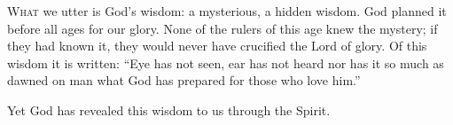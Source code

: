 
\lettrine{W}{hat} we utter is God’s wisdom: a mysterious, a hidden wisdom. God planned it before all ages for our glory. None of the rulers of this age knew the mystery; if they had known it, they would never have crucified the Lord of glory. Of this wisdom it is written:   “Eye has not seen, ear has not heard
      nor has it so much as dawned on man
      what God has prepared for those who love him.”

Yet God has revealed this wisdom to us through the Spirit.